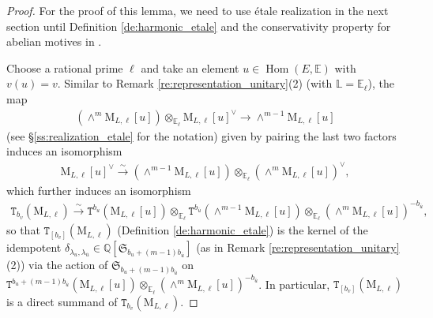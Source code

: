 \documentclass[12pt]{amsart}
\numberwithin{equation}{section}
\theoremstyle{plain}
\theoremstyle{definition}
\theoremstyle{remark}
\renewcommand{\d}[1]{\mathbb{#1}}
\newcommand{\f}[1]{\mathfrak{#1}}
\renewcommand{\r}[1]{\mathrm{#1}}
\renewcommand{\(}{\left(}
\renewcommand{\)}{\right)}
\newcommand{\ol}[1]{\overline{#1}{}}
\newcommand{\dE}{\d E}
\newcommand{\dL}{\d L}
\newcommand{\dQ}{\d Q}
\newcommand{\fS}{\f S}
\newcommand{\rM}{\r M}
\newcommand{\tT}{\mathtt{T}}
\DeclareMathOperator{\Hom}{Hom}
\begin{document}
\begin{proof}
For the proof of this lemma, we need to use \'{e}tale realization in the next section until Definition \ref{de:harmonic_etale} and the conservativity property for abelian motives in \cite{Wil18}.

Choose a rational prime $\ell$ and take an element $u\in\Hom(E,\dE)$ with $v(u)=v$. Similar to Remark \ref{re:representation_unitary}(2) (with $\dL=\dE_\ell$), the map
\begin{align}\label{eq:harmonic_motive_1}
(\wedge^m \rM_{L,\ell}[u])\otimes_{\dE_\ell} \rM_{L,\ell}[u]^\vee\to\wedge^{m-1}\rM_{L,\ell}[u]
\end{align}
(see \S\ref{ss:realization_etale} for the notation) given by pairing the last two factors induces an isomorphism
\begin{align}\label{eq:harmonic_motive_2}
\rM_{L,\ell}[u]^\vee\xrightarrow\sim (\wedge^{m-1}\rM_{L,\ell}[u])\otimes_{\dE_\ell}(\wedge^m\rM_{L,\ell}[u])^{\vee},
\end{align}
which further induces an isomorphism
\begin{align}\label{eq:harmonic_motive_3}
\tT_{b_v}(\rM_{L,\ell})\xrightarrow\sim \tT^{b_u}(\rM_{L,\ell}[u])\otimes_{\dE_\ell}\tT^{b_{\ol{u}}}(\wedge^{m-1}\rM_{L,\ell}[u])
\otimes_{\dE_\ell}(\wedge^m\rM_{L,\ell}[u])^{-b_{\ol{u}}},
\end{align}
so that $\tT_{[b_v]}(\rM_{L,\ell})$ (Definition \ref{de:harmonic_etale}) is the kernel of the idempotent $\delta_{\lambda_u,\lambda_{\ol{u}}}\in\dQ[\fS_{b_u+(m-1)b_{\ol{u}}}]$ (as in Remark \ref{re:representation_unitary}(2)) via the action of $\fS_{b_u+(m-1)b_{\ol{u}}}$ on $\tT^{b_u+(m-1)b_{\ol{u}}}(\rM_{L,\ell}[u])\otimes_{\dE_\ell}(\wedge^m\rM_{L,\ell}[u])^{-b_{\ol{u}}}$. In particular, $\tT_{[b_v]}(\rM_{L,\ell})$ is a direct summand of $\tT_{b_v}(\rM_{L,\ell})$.


\end{proof}
\end{document}
